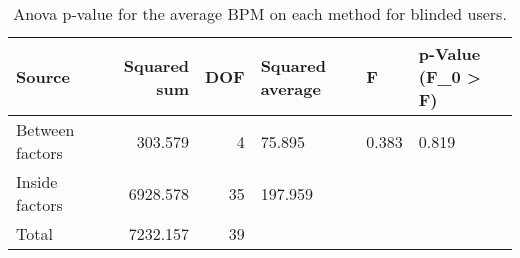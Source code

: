 
\begin{table}[!htb]
\centering
\caption{Anova p-value for the average BPM on each method for blinded users.}
\label{tab:anova_average_bpm}
\begin{tabular}{lrrlll}
\toprule
         Source &  Squared sum &  DOF & Squared average &     F & p-Value (F\_0 > F) \\
\midrule
Between factors &      303.579 &    4 &          75.895 & 0.383 &             0.819 \\
 Inside factors &     6928.578 &   35 &         197.959 &       &                   \\
          Total &     7232.157 &   39 &                 &       &                   \\
\bottomrule
\end{tabular}
\end{table}

